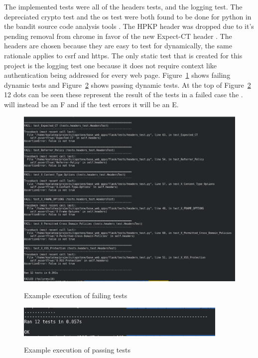 The implemented tests were all of the headers tests, and the logging test. The depreciated crypto test and the os test were both found to be done for python in the bandit source code analysis tools
\cite{bandit}. The HPKP header was dropped due to it's pending removal from chrome in favor of the new Expect-CT header \cite{hpkp}. The headers are chosen because they are easy to test for
dynamically, the same rationale applies to csrf and https. The only static test that is created for this project is the logging test one because it does not require context like authentication being
addressed for every web page. Figure~\ref{fig:fig2} shows failing dynamic tests and Figure~\ref{fig:fig3} shows passing dynamic tests. At the top of Figure~\ref{fig:fig3} 12 dots can be seen these
represent the result of the tests in a failed case the . will instead be an F and if the test errors it will be an E.
\begin{figure}[!ht]
  \centering
\includegraphics[width=5in]{unittestfail}
\caption{\label{fig:fig2}}Example execution of failing tests
\end{figure}
\begin{figure}[!ht]
  \centering
\includegraphics[width=4in]{unittestpass}
\caption{\label{fig:fig3}}Example execution of passing tests
\end{figure}


